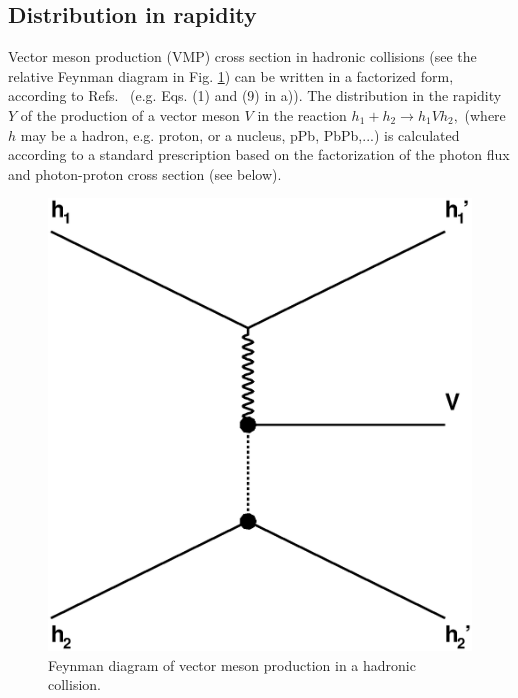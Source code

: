 \documentclass[12pt]{article}
\begin{document}
\subsection{Distribution in rapidity}\label{distribution}
Vector meson production (VMP) cross section in hadronic collisions (see the relative Feynman diagram in Fig. \ref{fig:vmp_feynman}) can be written in a factorized form, according to Refs.~ \cite{Brazil, Review} (e.g. Eqs. (1) and (9) in \cite{Brazil}a)).
The distribution in the rapidity $Y$ of the production of a vector meson $V$ in the reaction $h_1+h_2\rightarrow h_1Vh_2,$ (where $h$ may be a hadron, e.g. proton, or a nucleus, pPb, PbPb,...) is calculated according to a standard prescription based on the factorization of the photon flux and photon-proton cross section (see below).

\begin{figure}[!h]
\centering
 \includegraphics[width=.4\textwidth]{figures/exclusive_vmp.eps}
 \caption{Feynman diagram of vector meson production in a hadronic collision.}
 \label{fig:vmp_feynman}
\end{figure}
\end{document}
